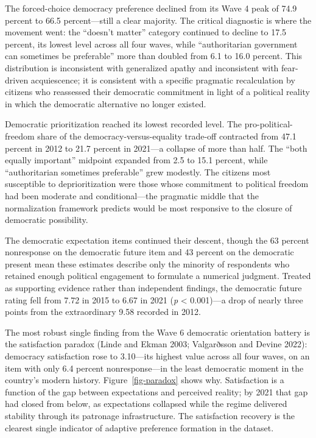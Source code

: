 \documentclass[Review,times,sageh,doublespace]{sagej}
\begin{document}
The forced-choice democracy preference declined from its Wave 4 peak of
74.9 percent to 66.5 percent---still a clear majority. The critical
diagnostic is where the movement went: the ``doesn't matter'' category
continued to decline to 17.5 percent, its lowest level across all four
waves, while ``authoritarian government can sometimes be preferable''
more than doubled from 6.1 to 16.0 percent. This distribution is
inconsistent with generalized apathy and inconsistent with fear-driven
acquiescence; it is consistent with a specific pragmatic recalculation
by citizens who reassessed their democratic commitment in light of a
political reality in which the democratic alternative no longer existed.

Democratic prioritization reached its lowest recorded level. The
pro-political-freedom share of the democracy-versus-equality trade-off
contracted from 47.1 percent in 2012 to 21.7 percent in 2021---a
collapse of more than half. The ``both equally important'' midpoint
expanded from 2.5 to 15.1 percent, while ``authoritarian sometimes
preferable'' grew modestly. The citizens most susceptible to
deprioritization were those whose commitment to political freedom had
been moderate and conditional---the pragmatic middle that the
normalization framework predicts would be most responsive to the closure
of democratic possibility.

The democratic expectation items continued their descent, though the 63
percent nonresponse on the democratic future item and 43 percent on the
democratic present mean these estimates describe only the minority of
respondents who retained enough political engagement to formulate a
numerical judgment. Treated as supporting evidence rather than
independent findings, the democratic future rating fell from 7.72 in
2015 to 6.67 in 2021 (\emph{p} \textless{} 0.001)---a drop of nearly
three points from the extraordinary 9.58 recorded in 2012.

The most robust single finding from the Wave 6 democratic orientation
battery is the satisfaction paradox (Linde and Ekman 2003; Valgarðsson
and Devine 2022): democracy satisfaction rose to 3.10---its highest
value across all four waves, on an item with only 6.4 percent
nonresponse---in the least democratic moment in the country's modern
history. Figure~\ref{fig-paradox} shows why. Satisfaction is a function
of the gap between expectations and perceived reality; by 2021 that gap
had closed from below, as expectations collapsed while the regime
delivered stability through its patronage infrastructure. The
satisfaction recovery is the clearest single indicator of adaptive
preference formation in the dataset.
\end{document}
